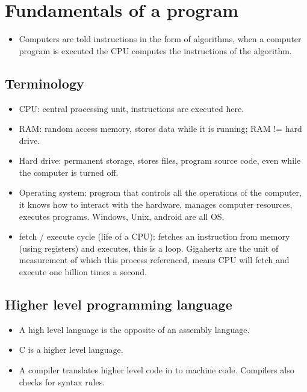 \section{Fundamentals of a program}
\begin{itemize}
    \item Computers are told instructions in the form of algorithms, when a computer program is executed the CPU computes the instructions of the algorithm. 
\end{itemize}

\subsection{Terminology}
\begin{itemize}
    \item CPU: central processing unit, instructions are executed here. 
    \item RAM: random access memory, stores data while it is running; RAM != hard drive.
    \item Hard drive: permanent storage, stores files, program source code, even while the computer is turned off.
    \item  Operating system: program that controls all the operations of the computer, it knows how to interact with the hardware, manages computer resources, executes programs. Windows, Unix, android are all OS.
    \item fetch / execute cycle (life of a CPU): fetches an instruction from memory (using registers) and executes, this is a loop. Gigahertz are the unit of measurement of which this process referenced, means CPU will fetch and execute one billion times a second. 
\end{itemize}

\subsection{Higher level programming language}
\begin{itemize}
    \item A high level language is the opposite of an assembly language.
    \item C is a higher level language. 
    \item A compiler translates higher level code in to machine code. Compilers also checks for syntax rules. 
\end{itemize}

